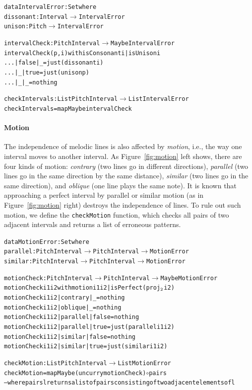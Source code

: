 \begin{alltt}
data IntervalError : Set where
  dissonant : Interval \(\rightarrow\) IntervalError
  unison    : Pitch \(\rightarrow\) IntervalError

intervalCheck : PitchInterval \(\rightarrow\) Maybe IntervalError
intervalCheck (p , i) with isConsonant i | isUnison i
... | false | _    = just (dissonant i)
... | _     | true = just (unison p)
... | _     | _    = nothing

checkIntervals : List PitchInterval \(\rightarrow\) List IntervalError
checkIntervals = mapMaybe intervalCheck
\end{alltt}

\paragraph{Motion}

\Motion

The independence of melodic lines is also affected by \emph{motion},
i.e., the way one interval moves to another interval.
As Figure~\ref{fig:motion} left shows, there are four kinds of motion:
\emph{contrary} (two lines go in different directions),
\emph{parallel} (two lines go in the same direction by the same
distance), \emph{similar} (two lines go in the same direction),
and \emph{oblique} (one line plays the same note).
It is known that approaching a perfect interval by parallel or similar
motion (as in Figure~\ref{fig:motion} right) destroys the independence
of lines.
To rule out such motion, we define the \texttt{checkMotion}
function, which checks all pairs of two adjacent intervals and
returns a list of erroneous patterns.

\begin{alltt}
data MotionError : Set where
  parallel : PitchInterval \(\rightarrow\) PitchInterval \(\rightarrow\) MotionError
  similar  : PitchInterval \(\rightarrow\) PitchInterval \(\rightarrow\) MotionError

motionCheck : PitchInterval \(\rightarrow\) PitchInterval \(\rightarrow\) Maybe MotionError
motionCheck i1 i2 with motion i1 i2 | isPerfect (proj\(\sb{\mathtt{2}}\) i2)
motionCheck i1 i2 | contrary | \_     = nothing
motionCheck i1 i2 | oblique  | \_     = nothing
motionCheck i1 i2 | parallel | false = nothing
motionCheck i1 i2 | parallel | true  = just (parallel i1 i2)
motionCheck i1 i2 | similar  | false = nothing
motionCheck i1 i2 | similar  | true  = just (similar i1 i2)

checkMotion : List PitchInterval \(\rightarrow\) List MotionError
checkMotion = mapMaybe (uncurry motionCheck) \(\circ\) pairs
-- where pairs l returns a list of pairs consisting of two adjacent elements of l
\end{alltt}

